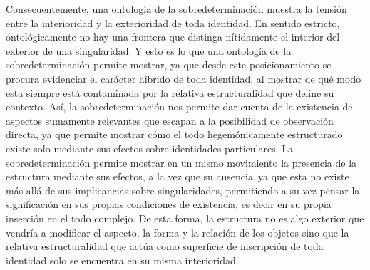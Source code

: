 Consecuentemente, una ontología de la sobredeterminación muestra la tensión entre la interioridad y la exterioridad de toda identidad. En sentido estricto, ontológicamente no hay una frontera que distinga nítidamente el interior del exterior de una singularidad. Y esto es lo que una ontología de la sobredeterminación permite mostrar, ya que desde este posicionamiento se procura evidenciar el carácter híbrido de toda identidad, al mostrar de qué modo esta siempre está contaminada por la relativa estructuralidad que define su contexto. Así, la sobredeterminación nos permite dar cuenta de la existencia de aspectos sumamente relevantes que escapan a la posibilidad de observación directa, ya que permite mostrar cómo el todo hegemónicamente estructurado existe solo mediante sus efectos sobre identidades particulares. La sobredeterminación permite mostrar en un mismo movimiento la presencia de la estructura mediante sus efectos, a la vez que su ausencia~ya que esta no existe más allá de sus implicancias sobre singularidades, permitiendo a su vez pensar la significación en sus propias condiciones de existencia, es decir en su propia inserción en el todo complejo. De esta forma, la estructura no es algo exterior que vendría a modificar el aspecto, la forma y la relación de los objetos sino que la relativa estructuralidad que actúa como superficie de inscripción de toda identidad solo se encuentra en su misma interioridad.

